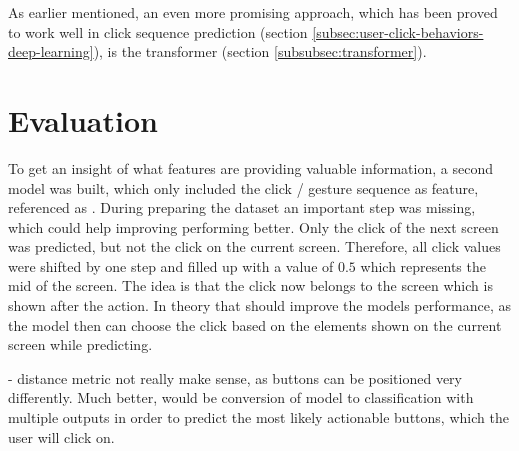 As earlier mentioned, an even more promising approach, which has been proved to work well in click sequence prediction (section \ref{subsec:user-click-behaviors-deep-learning}), is the transformer (section \ref{subsubsec:transformer}).

\section{Evaluation}

To get an insight of what features are providing valuable information, a second model was built, which only included the click / gesture sequence as feature, referenced as .
During preparing the dataset an important step was missing, which could help improving performing better.
Only the click of the next screen was predicted, but not the click on the current screen.
Therefore, all click values were shifted by one step and filled up with a value of $0.5$ which represents the mid of the screen.
The idea is that the click now belongs to the screen which is shown after the action.
In theory that should improve the models performance, as the model  then can choose the click based on the elements shown on the current screen while predicting.

- distance metric not really make sense, as buttons can be positioned very differently.
Much better, would be conversion of model to classification with multiple outputs in order to predict the most likely actionable buttons, which the user will click on.

